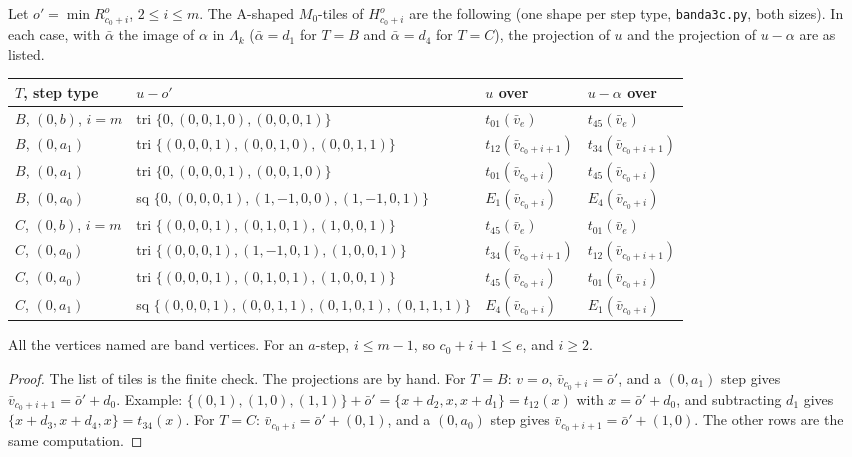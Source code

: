 \documentclass[11pt]{article}
\theoremstyle{definition}\newtheorem{definition}[theorem]{Definition}\newtheorem{remark}[theorem]{Remark}
\begin{document}
\begin{lemma}\label{lem:locus}
Let $o'=\min R^o_{c_0+i}$, $2\le i\le m$. The A-shaped $M_0$-tiles of $H^o_{c_0+i}$ are the following (one shape per step type, \texttt{banda3c.py}, both sizes). In each case, with $\bar\alpha$ the image of $\alpha$ in $\Lambda_k$ ($\bar\alpha=d_1$ for $T=B$ and $\bar\alpha=d_4$ for $T=C$), the projection of $u$ and the projection of $u-\alpha$ are as listed.
\begin{center}\small
\begin{tabular}{llll}
$T$, step type & $u-o'$ & $u$ over & $u-\alpha$ over\\\hline
$B$, $(0,b)$, $i=m$ & tri $\{0,(0,0,1,0),(0,0,0,1)\}$ & $t_{01}(\bar v_e)$ & $t_{45}(\bar v_e)$\\
$B$, $(0,a_1)$ & tri $\{(0,0,0,1),(0,0,1,0),(0,0,1,1)\}$ & $t_{12}(\bar v_{c_0+i+1})$ & $t_{34}(\bar v_{c_0+i+1})$\\
$B$, $(0,a_1)$ & tri $\{0,(0,0,0,1),(0,0,1,0)\}$ & $t_{01}(\bar v_{c_0+i})$ & $t_{45}(\bar v_{c_0+i})$\\
$B$, $(0,a_0)$ & sq $\{0,(0,0,0,1),(1,-1,0,0),(1,-1,0,1)\}$ & $E_1(\bar v_{c_0+i})$ & $E_4(\bar v_{c_0+i})$\\
$C$, $(0,b)$, $i=m$ & tri $\{(0,0,0,1),(0,1,0,1),(1,0,0,1)\}$ & $t_{45}(\bar v_e)$ & $t_{01}(\bar v_e)$\\
$C$, $(0,a_0)$ & tri $\{(0,0,0,1),(1,-1,0,1),(1,0,0,1)\}$ & $t_{34}(\bar v_{c_0+i+1})$ & $t_{12}(\bar v_{c_0+i+1})$\\
$C$, $(0,a_0)$ & tri $\{(0,0,0,1),(0,1,0,1),(1,0,0,1)\}$ & $t_{45}(\bar v_{c_0+i})$ & $t_{01}(\bar v_{c_0+i})$\\
$C$, $(0,a_1)$ & sq $\{(0,0,0,1),(0,0,1,1),(0,1,0,1),(0,1,1,1)\}$ & $E_4(\bar v_{c_0+i})$ & $E_1(\bar v_{c_0+i})$
\end{tabular}
\end{center}
All the vertices named are band vertices. For an $a$-step, $i\le m-1$, so $c_0+i+1\le e$, and $i\ge2$.
\end{lemma}
\begin{proof}
The list of tiles is the finite check. The projections are by hand. For $T=B$: $v=o$, $\bar v_{c_0+i}=\bar o'$, and a $(0,a_1)$ step gives $\bar v_{c_0+i+1}=\bar o'+d_0$. Example: $\{(0,1),(1,0),(1,1)\}+\bar o'=\{x+d_2,x,x+d_1\}=t_{12}(x)$ with $x=\bar o'+d_0$, and subtracting $d_1$ gives $\{x+d_3,x+d_4,x\}=t_{34}(x)$. For $T=C$: $\bar v_{c_0+i}=\bar o'+(0,1)$, and a $(0,a_0)$ step gives $\bar v_{c_0+i+1}=\bar o'+(1,0)$. The other rows are the same computation.
\end{proof}
\end{document}
